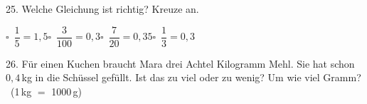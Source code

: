 \documentclass[11pt]{article}
\begin{document}
\begin{pfaufg}{}{25.}{}
Welche Gleichung ist richtig? Kreuze an.\par\medskip\noindent\hspace*{7mm}\mbox{$\square$\ $\dfrac{1}{5} = 1{,}5$}\hspace{10mm}\mbox{$\square$\ $\dfrac{3}{100} = 0{,}3$}\hspace{10mm}\mbox{$\square$\ $\dfrac{7}{20} = 0{,}35$}\hspace{10mm}\mbox{$\square$\ $\dfrac{1}{3} = 0{,}3$}\rule[-3mm]{0pt}{8mm}\par\smallskip 
{}
\end{pfaufg}

\begin{pfaufg}{}{26.}{}
Für einen Kuchen braucht Mara drei Achtel Kilogramm Mehl. Sie hat schon $0{,}4$\,kg in die Schüssel gefüllt. Ist das zu viel oder zu wenig? Um wie viel Gramm? \ (1\,kg $=$ 1000\,g)
\end{pfaufg}

\par\vfill{}
\end{document}
